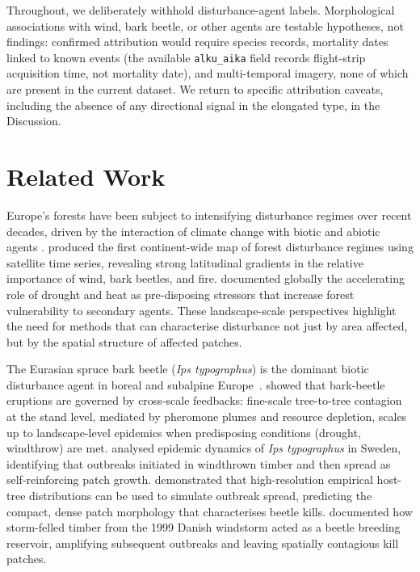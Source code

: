 \documentclass[twocolumn]{article}
\begin{document}
Throughout, we deliberately withhold disturbance-agent labels. Morphological associations with
wind, bark beetle, or other agents are testable hypotheses, not findings: confirmed attribution
would require species records, mortality dates linked to known events (the available
\texttt{alku\_aika} field records flight-strip acquisition time, not mortality date), and
multi-temporal imagery, none of which are present in the current dataset. We return to specific
attribution caveats, including the absence of any directional signal in the elongated type, in
the Discussion.

\section{Related Work}
\label{sec:related}

Europe's forests have been subject to intensifying disturbance regimes over recent decades,
driven by the interaction of climate change with biotic and abiotic agents
\citep{seidl2011unraveling, seidl2017forest}. \citet{senf2021mapping} produced the first
continent-wide map of forest disturbance regimes using satellite time series, revealing
strong latitudinal gradients in the relative importance of wind, bark beetles, and fire.
\citet{allen2010global} documented globally the accelerating role of drought and heat as
pre-disposing stressors that increase forest vulnerability to secondary agents. These
landscape-scale perspectives highlight the need for methods that can characterise disturbance
not just by area affected, but by the spatial structure of affected patches.

The Eurasian spruce bark beetle (\textit{Ips typographus}) is the dominant biotic disturbance
agent in boreal and subalpine Europe~\citep{hlasny2021bark}. \citet{raffa2008cross} showed
that bark-beetle eruptions are governed by cross-scale feedbacks: fine-scale tree-to-tree
contagion at the stand level, mediated by pheromone plumes and resource depletion, scales up
to landscape-level epidemics when predisposing conditions (drought, windthrow) are met.
\citet{jonsson2012epidemics} analysed epidemic dynamics of \textit{Ips typographus} in
Sweden, identifying that outbreaks initiated in windthrown timber and then spread as
self-reinforcing patch growth. \citet{kautz2011simulating} demonstrated that high-resolution
empirical host-tree distributions can be used to simulate outbreak spread, predicting the
compact, dense patch morphology that characterises beetle kills. \citet{wichmann2001spread}
documented how storm-felled timber from the 1999 Danish windstorm acted as a beetle
breeding reservoir, amplifying subsequent outbreaks and leaving spatially contagious kill
patches.
\end{document}
